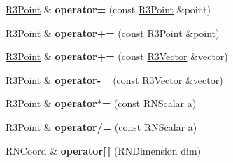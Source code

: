 \begin{DoxyCompactItemize}
\item 
\hyperlink{class_r3_point}{R3\+Point} \& {\bfseries operator=} (const \hyperlink{class_r3_point}{R3\+Point} \&point)\hypertarget{class_r3_point_ac30c085bfa89e10bdcdfa1bc64d7dda4}{}\label{class_r3_point_ac30c085bfa89e10bdcdfa1bc64d7dda4}

\item 
\hyperlink{class_r3_point}{R3\+Point} \& {\bfseries operator+=} (const \hyperlink{class_r3_point}{R3\+Point} \&point)\hypertarget{class_r3_point_ae1712f1eb6f5780f5241435142f572c5}{}\label{class_r3_point_ae1712f1eb6f5780f5241435142f572c5}

\item 
\hyperlink{class_r3_point}{R3\+Point} \& {\bfseries operator+=} (const \hyperlink{class_r3_vector}{R3\+Vector} \&vector)\hypertarget{class_r3_point_a4f0142ea39e215a275319d4f53b0f69c}{}\label{class_r3_point_a4f0142ea39e215a275319d4f53b0f69c}

\item 
\hyperlink{class_r3_point}{R3\+Point} \& {\bfseries operator-\/=} (const \hyperlink{class_r3_vector}{R3\+Vector} \&vector)\hypertarget{class_r3_point_a4408ecc328806ebaedcc8bd67417edcc}{}\label{class_r3_point_a4408ecc328806ebaedcc8bd67417edcc}

\item 
\hyperlink{class_r3_point}{R3\+Point} \& {\bfseries operator$\ast$=} (const R\+N\+Scalar a)\hypertarget{class_r3_point_a22c7bc9ef26edc4f8f36338f38d173d1}{}\label{class_r3_point_a22c7bc9ef26edc4f8f36338f38d173d1}

\item 
\hyperlink{class_r3_point}{R3\+Point} \& {\bfseries operator/=} (const R\+N\+Scalar a)\hypertarget{class_r3_point_ae2eb57d09b61bf1f805ddbf47bc57181}{}\label{class_r3_point_ae2eb57d09b61bf1f805ddbf47bc57181}

\item 
R\+N\+Coord \& {\bfseries operator\mbox{[}$\,$\mbox{]}} (R\+N\+Dimension dim)\hypertarget{class_r3_point_ac309f5d823e0951f50531b35757cd42f}{}\label{class_r3_point_ac309f5d823e0951f50531b35757cd42f}

\end{DoxyCompactItemize}
